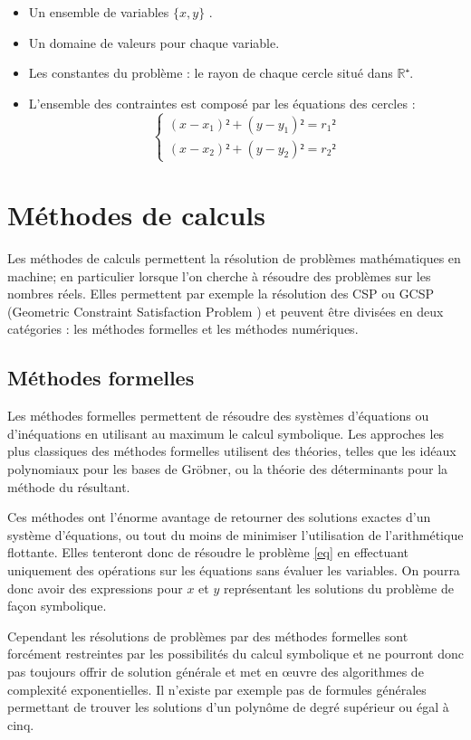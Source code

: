 \begin{itemize}
\item
Un ensemble de variables $\{x,y\}$ .
\item
Un domaine de valeurs pour chaque variable. 
\item
Les constantes du problème : le rayon de chaque cercle situé dans  $\mathbb{R⁺}$.
\item
L'ensemble des contraintes est composé par les équations des cercles :
\begin{equation}\label{eq}
\begin{cases}
(x-x_1)²+(y-y_1)² = r_1²\\
(x-x_2)²+(y-y_2)² = r_2²
\end{cases}
\end{equation}
\end{itemize}


\section{Méthodes de calculs}
Les méthodes de calculs permettent la résolution de problèmes mathématiques en machine; en particulier lorsque l'on cherche à résoudre des problèmes sur les nombres réels. Elles permettent par exemple la résolution des \textsc{CSP}  ou \textsc{GCSP} (Geometric Constraint Satisfaction Problem \cite{Jermann}) et peuvent être divisées en deux catégories : les méthodes formelles et les méthodes numériques.


\subsection{Méthodes formelles}
Les méthodes formelles permettent de résoudre des systèmes d'équations ou d'inéquations en utilisant au maximum le calcul symbolique. Les approches les plus classiques des méthodes formelles utilisent des théories, telles que les idéaux polynomiaux pour les bases de Gröbner, ou la théorie des déterminants pour la méthode du résultant.

 Ces méthodes ont l'énorme avantage de retourner des solutions exactes d'un système d'équations, ou tout du moins de minimiser l'utilisation de l'arithmétique flottante. Elles tenteront donc de résoudre le problème \ref{eq} en effectuant uniquement des opérations sur les équations sans évaluer les variables. On pourra donc avoir des expressions pour $x$ et $y$ représentant les solutions du problème de façon symbolique. 

Cependant les résolutions de problèmes par des méthodes formelles sont forcément restreintes par les possibilités du calcul symbolique et ne pourront donc pas toujours offrir de solution générale et met en œuvre des algorithmes de complexité exponentielles. Il n'existe par exemple pas de formules générales permettant de trouver les solutions d'un polynôme de degré supérieur ou égal à cinq.



